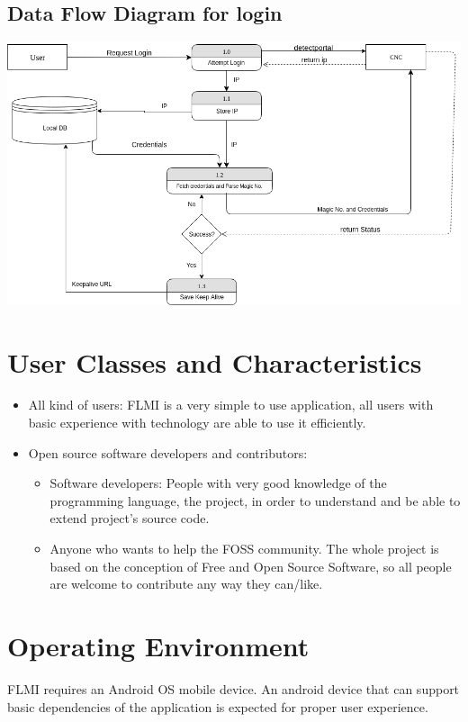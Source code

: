\subsection{Data Flow Diagram for login}
\includegraphics[width=\textwidth]{images/dfd.png}

\section{User Classes and Characteristics}

\begin{itemize}
    \item All kind of users: FLMI is a very simple to use application, all users with basic experience with technology are able to use it efficiently.
    \item Open source software developers and contributors: 
        \begin{itemize}
            \item Software developers: People with very good knowledge of the programming language, the project, in order to understand and be able to extend project's source code.
            \item Anyone who wants to help the FOSS community. The whole project is based on the conception of Free and Open Source Software, so all people are welcome to contribute any way they can/like.
        \end{itemize}
\end{itemize}

\section{Operating Environment}
FLMI requires an Android OS mobile device. An android device that can support basic dependencies of the application is expected for proper user experience.

